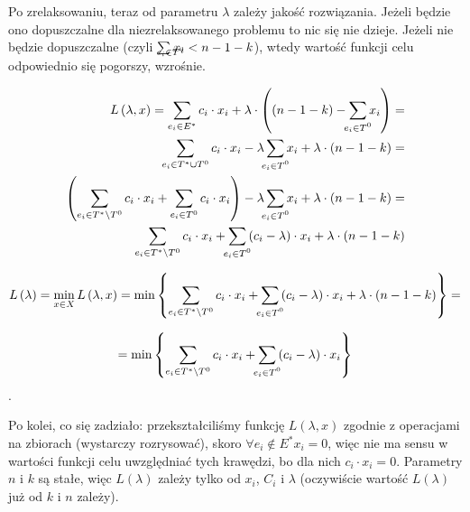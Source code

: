 \begin{itemize}
Po zrelaksowaniu, teraz od parametru $\lambda$ zależy jakość rozwiązania. Jeżeli będzie ono dopuszczalne dla niezrelaksowanego problemu to nic się nie dzieje. Jeżeli nie będzie dopuszczalne (czyli $\sum_{\mathclap{e_{i} \in T^{0}}} x_{i} < n - 1 - k$), wtedy wartość funkcji celu odpowiednio się pogorszy, wzrośnie.

\begin{eqnarray}
L \left( \lambda, x \right) = \sum_{e_{i} \in E^{\ast}} c_{i} \cdot x_{i} + \lambda \cdot \left( \left( n - 1 - k \right) - \sum_{\mathclap{e_{i} \in T^{0}}} x_{i} \right) = \\
\sum_{e_{i} \in T^{\ast} \cup T^{0}} c_{i} \cdot x_{i} - \lambda \sum_{\mathclap{e_{i} \in T^{0}}} x_{i} + \lambda \cdot \left( n - 1 - k \right) = \\
\left( \sum_{e_{i} \in T^{\ast} \setminus T^{0}} c_{i} \cdot x_{i} + \sum_{e_{i} \in T^{0}} c_{i} \cdot x_{i} \right) - \lambda \sum_{\mathclap{e_{i} \in T^{0}}} x_{i} + \lambda \cdot \left( n - 1 - k \right) = \\
\sum_{e_{i} \in T^{\ast} \setminus T^{0}} c_{i} \cdot x_{i} + \sum_{\mathclap{e_{i} \in T^{0}}} \left( c_{i} - \lambda \right) \cdot x_{i} + \lambda \cdot \left( n - 1 - k \right)
\end{eqnarray}

\begin{eqnarray}
L \left( \lambda \right) = \min_{x \in X} L \left( \lambda, x \right) = \min \left\{ \sum_{e_{i} \in T^{\ast} \setminus T^{0}} c_{i} \cdot x_{i} + \sum_{\mathclap{e_{i} \in T^{0}}} \left( c_{i} - \lambda \right) \cdot x_{i} + \lambda \cdot \left( n - 1 - k \right) \right\} =
\end{eqnarray}

\begin{eqnarray}
= \min \left\{ \sum_{e_{i} \in T^{\ast} \setminus T^{0}} c_{i} \cdot x_{i} + \sum_{\mathclap{e_{i} \in T^{0}}} \left( c_{i} - \lambda \right) \cdot x_{i} \right\}
\end{eqnarray}.

Po kolei, co się zadziało: przekształciliśmy funkcję $L \left( \lambda, x \right)$ zgodnie z operacjami na zbiorach (wystarczy rozrysować), skoro $\forall e_{i} \notin E^{\ast} x_{i} = 0$, więc nie ma sensu w wartości funkcji celu uwzględniać tych krawędzi, bo dla nich $c_{i} \cdot x_{i} = 0$. Parametry $n$ i $k$ są stałe, więc $L \left( \lambda \right)$ zależy tylko od $x_{i}$, $C_{i}$ i $\lambda$ (oczywiście wartość $L \left( \lambda \right)$ już od $k$ i $n$ zależy).


\end{itemize}
